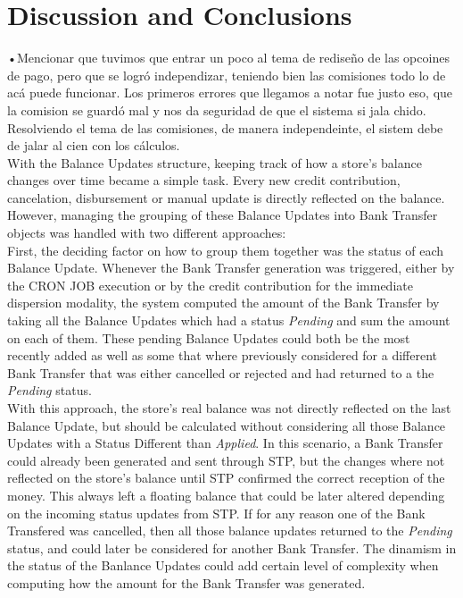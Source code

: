 
\chapter{Discussion and Conclusions}

•Mencionar que tuvimos que entrar un poco al tema de rediseño de las opcoines de pago, pero que se logró independizar, teniendo bien las comisiones todo lo de acá puede funcionar. Los primeros errores que llegamos a notar fue justo eso, que la comision se guardó mal y nos da seguridad de que el sistema si jala chido. Resolviendo el tema de las comisiones, de manera independeinte, el sistem debe de jalar al cien con los cálculos. \\

With the Balance Updates structure, keeping track of how a store's balance changes over time became a simple task. Every new credit contribution, cancelation, disbursement or manual update is directly reflected on the balance. However, managing the grouping of these Balance Updates into Bank Transfer objects was handled with two different approaches:\\

First, the deciding factor on how to group them together was the status of each Balance Update. Whenever the Bank Transfer generation was triggered, either by the CRON JOB execution or by the credit contribution for the immediate dispersion modality, the system computed the amount of the Bank Transfer by taking all the Balance Updates which had a status \textit{Pending} and sum the amount on each of them. These pending Balance Updates could both be the most recently added as well as some that where previously considered for a different Bank Transfer that was either cancelled or rejected and had returned to a the \textit{Pending }status.\\ 

With this approach, the store's real balance was not directly reflected on the last Balance Update, but should be calculated without considering all those Balance Updates with a Status Different than \textit{Applied}. In this scenario, a Bank Transfer could already been generated and sent through STP, but the changes where not reflected on the store's balance until STP confirmed the correct reception of the money. This always left a floating balance that could be later altered depending on the incoming status updates from STP. If for any reason one of the Bank Transfered was cancelled, then all those balance updates returned to the \textit{Pending} status, and could later be considered for another Bank Transfer. The dinamism in the status of the Banlance Updates could add certain level of complexity when computing how the amount for the Bank Transfer was generated.\\ 


